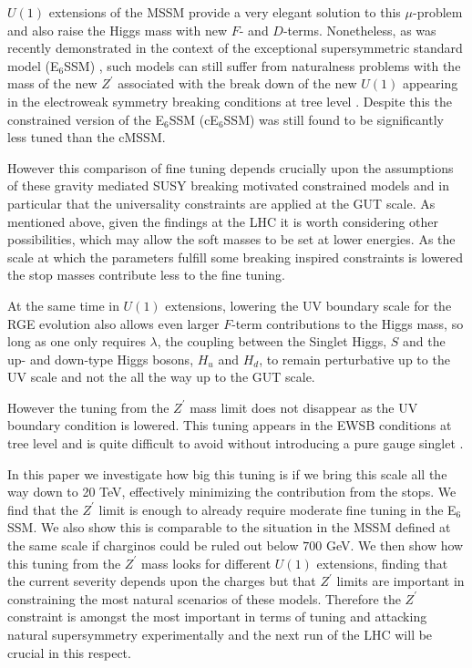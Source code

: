 \documentclass[preprint,amsmath,amssymb,aps,superscriptaddress,prd,
showpacs,floatfix,nofootinbib]{revtex4-1}
\begin{document}
$U(1)$ extensions of the MSSM provide a very elegant solution to this
$\mu$-problem \cite{Fayet:1977yc, Kim:1983dt, Suematsu:1994qm,
Cvetic:1995rj, Cvetic:1996mf, Jain:1995cb, Nir:1995bu,
Cvetic:1997ky} and also raise the Higgs mass with new $F$- and
$D$-terms.  Nonetheless, as was recently demonstrated in the context of
the exceptional supersymmetric standard model (E$_6$SSM)
\cite{King:2005jy, King:2005my, Athron:2010zz}, such models can still
suffer from naturalness problems with the mass of the new $Z^\prime$
associated with the break down of the new $U(1)$ appearing in the
electroweak symmetry breaking conditions at tree level \cite{Athron:2013ipa}.
Despite this the constrained version of the E$_6$SSM (cE$_6$SSM)
\cite{Athron:2009ue, Athron:2009bs} was still found to be significantly
less tuned than the cMSSM.

However this comparison of fine tuning depends crucially upon the
assumptions of these gravity mediated SUSY breaking motivated
constrained models and in particular that the universality
constraints are applied at the GUT scale.  As mentioned above, given
the findings at the LHC it is worth considering other possibilities,
which may allow the soft masses to be set at lower energies.  As the
scale at which the parameters fulfill some breaking inspired
constraints is lowered the stop masses contribute less to the fine
tuning.

At the same time in $U(1)$ extensions, lowering the UV boundary scale
for the RGE evolution also allows even larger $F$-term contributions
to the Higgs mass, so long as one only requires $\lambda$, the
coupling between the Singlet Higgs, $S$ and the up- and down-type
Higgs bosons, $H_u$ and $H_d$, to remain perturbative up to the UV
scale and not the all the way up to the GUT scale.

However the tuning from the $Z^\prime$ mass limit does not disappear
as the UV boundary condition is lowered.  This tuning appears in the
EWSB conditions at tree level and is quite difficult to avoid without
introducing a pure gauge singlet \cite{Athron:2014pua}.

In this paper we investigate how big this tuning is if we bring this
scale all the way down to 20 TeV, effectively minimizing the contribution
from the stops.  We find that the $Z^\prime$ limit is enough to already
require moderate fine tuning in the E$_6$SSM.  We also show this is
comparable to the situation in the MSSM defined at the same scale if
charginos could be ruled out below $700$ GeV.  We then show how this
tuning from the $Z^\prime$ mass looks for different $U(1)$ extensions,
finding that the current severity depends upon the charges but that
$Z^\prime$ limits are important in constraining the most natural
scenarios of these models.  Therefore the $Z^\prime$ constraint
is amongst the most important in terms of tuning and attacking natural
supersymmetry experimentally and the next run of the LHC will be
crucial in this respect.
\end{document}
